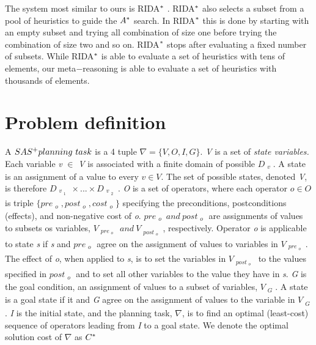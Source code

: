 The system most similar to ours is RIDA$\sp{*}$ \cite{BarleySantiagoOver}. RIDA$\sp{*}$ also selects a subset from a pool of heuristics to guide the $A\sp{*}$ search. In RIDA$\sp{*}$ this is done by starting with an empty subset and trying all combination of size one before trying the combination of size two and so on. RIDA$\sp{*}$ stops after evaluating a fixed number of subsets. While RIDA$\sp{*}$ is able to evaluate a set of heuristics with tens of elements, our meta$-$reasoning is able to evaluate a set of heuristics with thousands of elements.

\section{Problem definition}

A $SAS\sp{+} planning\ task$ \cite{backstrom1995complexity} is a 4 tuple $\nabla = \{V, O, I, G\}.$ \textit{V} is a set of \textit{state variables.} Each variable \textit{v} $\in$ \textit{V} is associated with a finite domain of possible $D_{\substack{v}}$. A state is an assignment of a value to every $v \in V.$ The set of possible states, denoted \textit{V}, is therefore $D_{\substack{v_{\substack{1}}}}    \times ... \times D_{\substack{v_{\substack{2}}}}$. \textit{O} is a set of operators, where each operator $o \in O$ is triple $\{pre_{\substack{o}} , post_{\substack{o}}, cost_{\substack{o}}\}$ specifying the preconditions, postconditions (effects), and non-negative cost of \textit{o}. $pre_{\substack{o}}\ and\ post_{\substack{o}}$ are assignments of values to subsets os variables, $V_{\substack{pre_{\substack{o}}}}\ and\ V_{\substack{post_{\substack{o}}}}$, respectively. Operator \textit{o} is applicable to state \textit{s} if \textit{s} and $pre_{\substack{o}}$ agree on the assignment of values to variables in $V_{\substack{pre_{\substack{o}}}}$. The effect of \textit{o}, when applied to \textit{s}, is to set the variables in $V_{\substack{post_{\substack{o}}}}$ to the values specified in $post_{\substack{o}}$ and to set all other variables to the value they have in \textit{s}. \textit{G} is the goal condition, an assignment of values to a subset of variables, $V_{\substack{G}}$. A state is a goal state if it and \textit{G} agree on the assignment of values to the variable in $V_{\substack{G}}$. \textit{I} is the initial state, and the planning task, $\nabla$, is to find an optimal (least-cost) sequence of operators leading from \textit{I} to a goal state. We denote the optimal solution cost of $\nabla$ as $C\sp{*}$ \\

